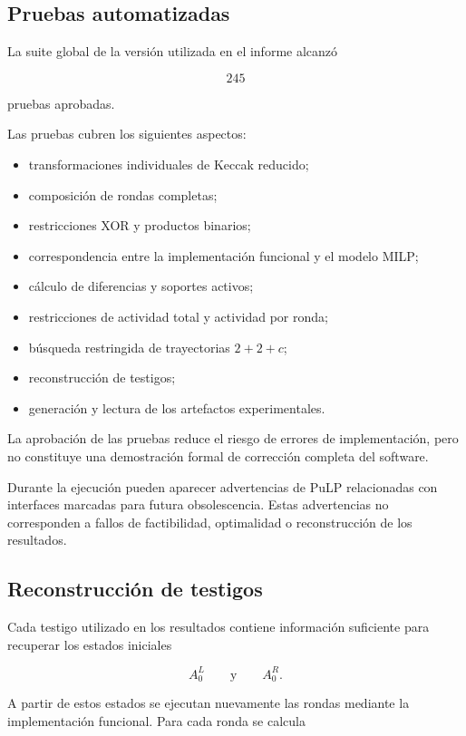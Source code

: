 \subsection{Pruebas automatizadas}
\label{subsec:pruebas_automatizadas}

La suite global de la versión utilizada en el informe alcanzó

\[
245
\]

pruebas aprobadas.

Las pruebas cubren los siguientes aspectos:

\begin{itemize}
    \item transformaciones individuales de Keccak reducido;
    \item composición de rondas completas;
    \item restricciones XOR y productos binarios;
    \item correspondencia entre la implementación funcional y el modelo
    MILP;
    \item cálculo de diferencias y soportes activos;
    \item restricciones de actividad total y actividad por ronda;
    \item búsqueda restringida de trayectorias $2+2+c$;
    \item reconstrucción de testigos;
    \item generación y lectura de los artefactos experimentales.
\end{itemize}

La aprobación de las pruebas reduce el riesgo de errores de implementación,
pero no constituye una demostración formal de corrección completa del
software.

Durante la ejecución pueden aparecer advertencias de PuLP relacionadas con
interfaces marcadas para futura obsolescencia. Estas advertencias no
corresponden a fallos de factibilidad, optimalidad o reconstrucción de los
resultados.


\subsection{Reconstrucción de testigos}
\label{subsec:reconstruccion_testigos}

Cada testigo utilizado en los resultados contiene información suficiente
para recuperar los estados iniciales

\[
A_0^L
\qquad \text{y} \qquad
A_0^R.
\]

A partir de estos estados se ejecutan nuevamente las rondas mediante la
implementación funcional. Para cada ronda se calcula

